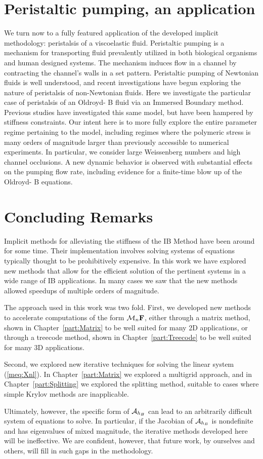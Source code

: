 \chapter{Peristaltic pumping, an application}
\noindent
We turn now to a fully featured application of the developed implicit methodology: peristalsis of a viscoelastic fluid.
Peristaltic pumping is a mechanism for transporting fluid prevalently utilized in both biological organisms and human designed systems. The mechanism induces flow in a channel by contracting the channel's walls in a set pattern. Peristaltic pumping of Newtonian fluids is well understood, and recent investigations have begun exploring the nature of peristalsis of non-Newtonian fluids. Here we investigate the particular case of peristalsis of an Oldroyd- B fluid via an Immersed Boundary method. Previous studies have investigated this same model, but have been hampered by stiffness constraints. Our intent here is to more fully explore the entire parameter regime pertaining to the model, including regimes where the polymeric stress is many orders of magnitude larger than previously accessible to numerical experiments. In particular,  we consider large Weissenberg numbers and high channel occlusions. A new dynamic behavior is observed with substantial effects on the pumping flow rate, including evidence for a finite-time blow up of the Oldroyd- B equations.




\chapter{Concluding Remarks}
\noindent
Implicit methods for alleviating the stiffness of the IB Method have been around for some time. Their implementation involves solving systems of equations typically thought to be prohibitively expensive. In this work we have explored new methods that allow for the efficient solution of the pertinent systems in a wide range of IB applications. In many cases we saw that the new methods allowed speedups of multiple orders of magnitude.

The approach used in this work was two fold. First, we developed new methods to accelerate computations of the form $\mathcal{M}_n\mathbf{F}$, either through a matrix method, shown in Chapter~\ref{part:Matrix} to be well suited for many 2D applications, or through a treecode method, shown in Chapter~\ref{part:Treecode} to be well suited for many 3D applications.

Second, we explored new iterative techniques for solving the linear system (\ref{meq:Xnl}). In Chapter~\ref{part:Matrix} we explored a multigrid approach, and in Chapter~\ref{part:Splitting} we explored the splitting method, suitable to cases where simple Krylov methods are inapplicable.

Ultimately, however, the specific form of $\mathcal{A}_{h_B}$ can lead to an arbitrarily difficult system of equations to solve. In particular, if the Jacobian of $\mathcal{A}_{h_B}$ is nondefinite and has eigenvalues of mixed magnitude, the iterative methods developed here will be ineffective. We are confident, however, that future work, by ourselves and others, will fill in such gaps in the methodology.
